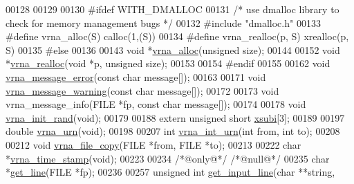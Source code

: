 \begin{DoxyCode}
00128 
00129 
00130 \textcolor{preprocessor}{#ifdef WITH\_DMALLOC}
00131 \textcolor{comment}{/* use dmalloc library to check for memory management bugs */}
00132 \textcolor{preprocessor}{#include "dmalloc.h"}
00133 \textcolor{preprocessor}{#define vrna\_alloc(S)       calloc(1,(S))}
00134 \textcolor{preprocessor}{#define vrna\_realloc(p, S)  xrealloc(p, S)}
00135 \textcolor{preprocessor}{#else}
00136 
00143 \textcolor{keywordtype}{void}  *\hyperlink{group__utils_gaf37a0979367c977edfb9da6614eebe99}{vrna\_alloc}(\textcolor{keywordtype}{unsigned} size);
00144 
00152 \textcolor{keywordtype}{void}  *\hyperlink{group__utils_ga27f4719a66c6f90d1cca3d1e6e696c6a}{vrna\_realloc}(\textcolor{keywordtype}{void} *p, \textcolor{keywordtype}{unsigned} size);
00153 
00154 \textcolor{preprocessor}{#endif}
00155 
00162 \textcolor{keywordtype}{void} \hyperlink{group__utils_gabb76f8f8dbd652fa4a24037cf4524373}{vrna\_message\_error}(\textcolor{keyword}{const} \textcolor{keywordtype}{char} message[]);
00163 
00171 \textcolor{keywordtype}{void} \hyperlink{group__utils_gafe4072406bd287c6857763dd7d2fe1f1}{vrna\_message\_warning}(\textcolor{keyword}{const} \textcolor{keywordtype}{char} message[]);
00172 
00173 \textcolor{keywordtype}{void} vrna\_message\_info(FILE *fp, \textcolor{keyword}{const} \textcolor{keywordtype}{char} message[]);
00174 
00178 \textcolor{keywordtype}{void} \hyperlink{group__utils_ga0ad1f40ea316e5c5918695c35613027a}{vrna\_init\_rand}(\textcolor{keywordtype}{void});
00179 
00188 \textcolor{keyword}{extern} \textcolor{keywordtype}{unsigned} \textcolor{keywordtype}{short} \hyperlink{group__utils_gaf9a866c8417afda7368bbac939ab3c47}{xsubi}[3];
00189 
00197 \textcolor{keywordtype}{double} \hyperlink{group__utils_ga384e256ebb295d04a14426179db0dd6e}{vrna\_urn}(\textcolor{keywordtype}{void});
00198 
00207 \textcolor{keywordtype}{int} \hyperlink{group__utils_ga46111bb3747dbcf4609f0d40ae169ad9}{vrna\_int\_urn}(\textcolor{keywordtype}{int} from, \textcolor{keywordtype}{int} to);
00208 
00212 \textcolor{keywordtype}{void} \hyperlink{group__utils_ga4382a56d2fee9ed738364b99329edc7c}{vrna\_file\_copy}(FILE *from, FILE *to);
00213 
00222 \textcolor{keywordtype}{char}  *\hyperlink{group__utils_gad3bbe8d01afb1310609cb018d5290550}{vrna\_time\_stamp}(\textcolor{keywordtype}{void});
00223 
00234 \textcolor{comment}{/*@only@*/} \textcolor{comment}{/*@null@*/}
00235 \textcolor{keywordtype}{char}  *\hyperlink{group__utils_gabe51806d14cff0789a8c1df7dbc45b71}{get\_line}(FILE *fp);
00236 
00257 \textcolor{keywordtype}{unsigned} \textcolor{keywordtype}{int} \hyperlink{group__utils_ga8ef1835eb83f542396f59f0b205965e5}{get\_input\_line}(\textcolor{keywordtype}{char} **\textcolor{keywordtype}{string},

\end{DoxyCode}
